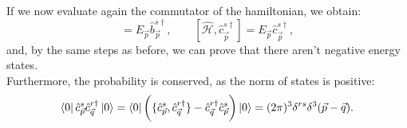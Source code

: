 If we now evaluate again the commutator of the hamiltonian, we obtain:
\begin{equation*}
    [\hat{\mathcal{H} },\hat{b}^{s\dagger}_{\vec{p}}]=E_{\vec p}\hat{b}^{s\dagger}_{\vec{p}},\qquad[\hat{\mathcal{H} },\hat{c}^{s\dagger}_{\vec{p}}]=E_{\vec p}\hat{c}^{s\dagger}_{\vec{p}},
\end{equation*}
and, by the same steps as before, we can prove that there aren't negative energy states.\\
Furthermore, the probability is conserved, as the norm of states is positive:
\begin{equation*}
    \bra{0}\hat{c}_{\vec p}^{s}\hat{c}_{\vec q}^{r\dagger}\ket{0}=\bra{0}\bigg(\{\hat{c}_{\vec p}^{s},\hat{c}_{\vec q}^{r\dagger}\}-\hat{c}_{\vec q}^{r\dagger}\hat{c}_{\vec p}^{s}\bigg)\ket{0}=(2\pi)^3\delta^{rs}\delta^3(\vec p-\vec q).
\end{equation*}
